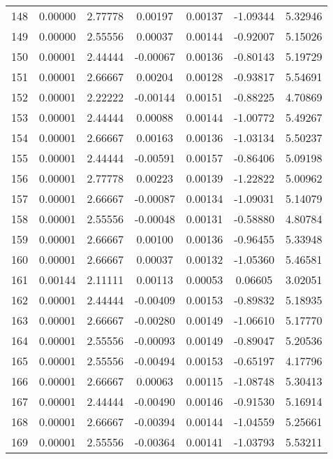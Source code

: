 \begin{longtable}{c c c c c c c}
148 &  0.00000 &      2.77778 &  0.00197 &   0.00137 &  -1.09344 &   5.32946 \\
149 &  0.00000 &      2.55556 &  0.00037 &   0.00144 &  -0.92007 &   5.15026 \\
150 &  0.00001 &      2.44444 & -0.00067 &   0.00136 &  -0.80143 &   5.19729 \\
151 &  0.00001 &      2.66667 &  0.00204 &   0.00128 &  -0.93817 &   5.54691 \\
152 &  0.00001 &      2.22222 & -0.00144 &   0.00151 &  -0.88225 &   4.70869 \\
153 &  0.00001 &      2.44444 &  0.00088 &   0.00144 &  -1.00772 &   5.49267 \\
154 &  0.00001 &      2.66667 &  0.00163 &   0.00136 &  -1.03134 &   5.50237 \\
155 &  0.00001 &      2.44444 & -0.00591 &   0.00157 &  -0.86406 &   5.09198 \\
156 &  0.00001 &      2.77778 &  0.00223 &   0.00139 &  -1.22822 &   5.00962 \\
157 &  0.00001 &      2.66667 & -0.00087 &   0.00134 &  -1.09031 &   5.14079 \\
158 &  0.00001 &      2.55556 & -0.00048 &   0.00131 &  -0.58880 &   4.80784 \\
159 &  0.00001 &      2.66667 &  0.00100 &   0.00136 &  -0.96455 &   5.33948 \\
160 &  0.00001 &      2.66667 &  0.00037 &   0.00132 &  -1.05360 &   5.46581 \\
161 &  0.00144 &      2.11111 &  0.00113 &   0.00053 &   0.06605 &   3.02051 \\
162 &  0.00001 &      2.44444 & -0.00409 &   0.00153 &  -0.89832 &   5.18935 \\
163 &  0.00001 &      2.66667 & -0.00280 &   0.00149 &  -1.06610 &   5.17770 \\
164 &  0.00001 &      2.55556 & -0.00093 &   0.00149 &  -0.89047 &   5.20536 \\
165 &  0.00001 &      2.55556 & -0.00494 &   0.00153 &  -0.65197 &   4.17796 \\
166 &  0.00001 &      2.66667 &  0.00063 &   0.00115 &  -1.08748 &   5.30413 \\
167 &  0.00001 &      2.44444 & -0.00490 &   0.00146 &  -0.91530 &   5.16914 \\
168 &  0.00001 &      2.66667 & -0.00394 &   0.00144 &  -1.04559 &   5.25661 \\
169 &  0.00001 &      2.55556 & -0.00364 &   0.00141 &  -1.03793 &   5.53211 \\

\end{longtable}
